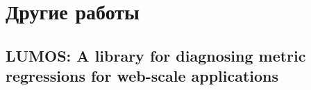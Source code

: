 

\chapter{Другие работы}

\section*{LUMOS: A library for diagnosing metric regressions for web-scale applications}